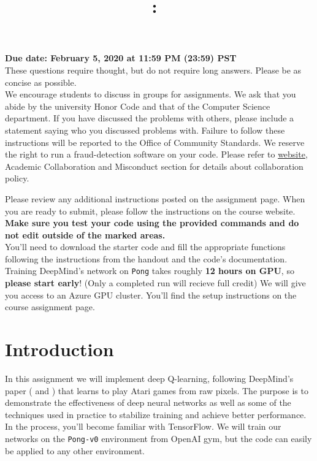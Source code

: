 \documentclass{article}
\title{
\vspace{-1in}
\textmd{\textbf{\hmwkClass:\ \hmwkTitle}}}
\author{}
\date{} %
\begin{document}
\maketitle
\vspace{-.5in}
\begin{framed}
{\bf Due date: February 5, 2020 at 11:59 PM (23:59) PST}
\\[1em]
These questions require thought, but do not require long answers. Please be as concise as possible.
\\[1em]
We encourage students to discuss in groups for assignments. We ask
that you abide by the university Honor Code and that of the Computer Science department. If you have discussed the problems with others,
please include a statement saying who you discussed problems with. Failure to follow these instructions
will be reported to the Office of Community Standards. We reserve the right to run a fraud-detection software on your code. Please refer to \href{http://web.stanford.edu/class/cs234/index.html}{website}, Academic Collaboration and Misconduct section for details about collaboration policy.

Please review any additional instructions posted on the assignment page. When you are ready to submit, please
follow the instructions on the course website. \textbf{Make sure you test your code using the
provided commands and do not edit outside of the marked areas.}
\\[1em]
You'll need to download the starter code and fill the appropriate functions following the instructions from the handout and the code's documentation. Training DeepMind's network on \texttt{Pong} takes roughly \textbf{12 hours on GPU}, so \textbf{please start early}! (Only a completed run will recieve full credit) We will give you access to an Azure GPU cluster. You'll find the setup instructions on the course assignment page.
\end{framed}
\section*{Introduction}

In this assignment we will implement deep Q-learning, following DeepMind's paper (\cite{mnih2015human} and \cite{mnih-atari-2013}) that learns to play Atari games from raw pixels. The purpose is to demonstrate the effectiveness of deep neural networks as well as some of the techniques used in practice to stabilize training and achieve better performance. In the process, you'll become familiar with TensorFlow. We will train our networks on the \texttt{Pong-v0} environment from OpenAI gym, but the code can easily be applied to any other environment. \\
\end{document}
